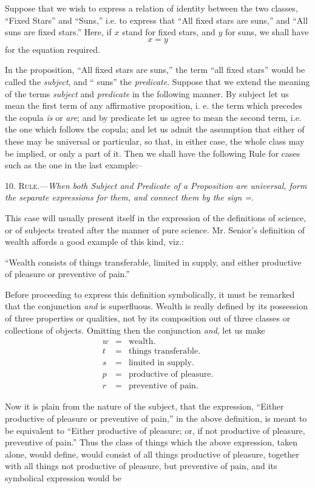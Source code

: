 \documentclass[oneside]{book}
\begin{document}
Suppose that we wish to express a relation of identity between
the two classes, ``Fixed Stars'' and ``Suns,'' i.e. to
express that ``All fixed stars are suns,'' and ``All suns are fixed
stars.'' Here, if $x$ stand for fixed stars, and $y$ for suns, we shall
have
\[
x = y
\]
for the equation required.


In the proposition, ``All fixed stars are suns,'' the term ``all
fixed stars'' would be called the \textit{subject}, and `` suns'' the \textit{predicate}.
Suppose that we extend the meaning of the terms \textit{subject}
and \textit{predicate} in the following manner. By subject let us mean
the first term of any affirmative proposition, i. e. the term which
precedes the copula \textit{is} or \textit{are}; and by predicate let us agree to
mean the second term, i.e. the one which follows the copula;
and let us admit the assumption that either of these may be universal
or particular, so that, in either case, the whole class may
be implied, or only a part of it. Then we shall have the following
Rule for cases such as the one in the last example:--

10. \textsc{Rule.}---\textit{When both Subject and Predicate of a Proposition
are universal, form the separate expressions for them, and connect them
by the sign =.}

This case will usually present itself in the expression of the
definitions of science, or of subjects treated after the manner of
pure science. Mr. Senior's definition of wealth affords a good
example of this kind, viz.:

``Wealth consists of things transferable, limited in supply,
and either productive of pleasure or preventive of pain.''

Before proceeding to express this definition symbolically, it
must be remarked that the conjunction \textit{and} is superfluous.
Wealth is really defined by its possession of three properties or
qualities, not by its composition out of three classes or collections
of objects. Omitting then the conjunction \textit{and}, let us make
\begin{eqnarray*}
w &=& \textrm{wealth.} \\
t &=& \textrm{things transferable.} \\
s &=& \textrm{limited in supply.} \\
p &=& \textrm{productive of pleasure.} \\
r &=& \textrm{preventive of pain.}
\end{eqnarray*}

Now it is plain from the nature of the subject, that the expression,
``Either productive of pleasure or preventive of pain,''
in the above definition, is meant to be equivalent to ``Either productive
of pleasure; or, if not productive of pleasure, preventive
of pain.'' Thus the class of things which the above expression,
taken alone, would define, would consist of all things productive
of pleasure, together with all things not productive of pleasure,
but preventive of pain, and its symbolical expression would be
\end{document}
